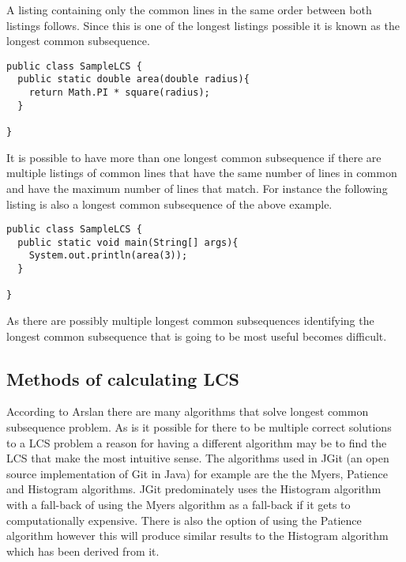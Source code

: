 \begin{minipage}[t]{1.0\textwidth}
A listing containing only the common lines in the same order between both listings follows.  Since this is one of the longest listings possible it is known as the longest common subsequence.  

\begin{lstlisting}
public class SampleLCS { 
  public static double area(double radius){
    return Math.PI * square(radius);
  }
  
}
\end{lstlisting}
\end{minipage}

\begin{minipage}[t]{1.0\textwidth}
It is possible to have more than one longest common subsequence if there are multiple listings of common lines that have the same number of lines in common and have the maximum number of lines that match.  For instance the following listing is also a longest common subsequence of the above example.

\begin{lstlisting}
public class SampleLCS {
  public static void main(String[] args){
    System.out.println(area(3));
  }
 
}
\end{lstlisting}
\end{minipage}

As there are possibly multiple longest common subsequences identifying the longest common subsequence that is going to be most useful becomes difficult.

\subsection{Methods of calculating LCS}
According to Arslan \cite{Arslan2010} there are many algorithms that solve longest common subsequence problem. As is it possible for there to be multiple correct solutions to a LCS problem a reason for having a different algorithm may be to find the LCS that make the most intuitive sense. The algorithms used in JGit (an open source implementation of Git in Java) for example are the the Myers, Patience and Histogram algorithms. JGit predominately uses the Histogram algorithm with a fall-back of using the Myers algorithm as a fall-back if it gets to computationally expensive.  There is also the option of using the Patience algorithm however this will produce similar results to the Histogram algorithm which has been derived from it. 

